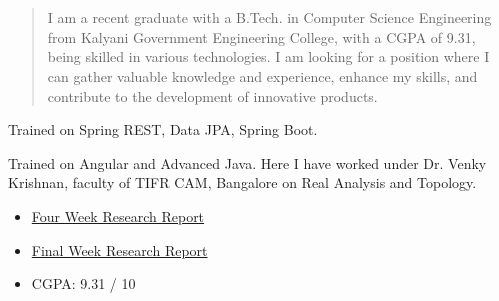 \documentclass[10pt,legalpaper,ragged2e,withhyper]{altacv}
\begin{document}
\begin{paracol}{2}


    \\
    \\

    \newpage

    \switchcolumn

    \begin{quote}
        I am a recent graduate with a B.Tech. in Computer Science Engineering from Kalyani Government Engineering College, with a CGPA of 9.31, being skilled in various technologies. I am looking for a position where I can gather valuable knowledge and experience, enhance my skills, and contribute to the development of innovative products.
    \end{quote}

    Trained on Spring REST, Data JPA, Spring Boot.
    \divider

    Trained on Angular and Advanced Java.
    \divider
    Here I have worked under Dr. Venky Krishnan, faculty of TIFR CAM, Bangalore on Real Analysis and Topology. \\
    \begin{itemize}
        \item \href{https://www.academia.edu/94639467/Four_Week_Research_Report_of_IASC_INSA_NASI_Summer_Research_Fellowship?source=swp_share}{Four Week Research Report}
        \item \href{https://www.academia.edu/94640080/Final_Week_Research_Report_of_IASC_INSA_NASI_Summer_Research_Fellowship?source=swp_share}{Final Week Research Report}
    \end{itemize}

    \begin{itemize}
        \item CGPA: 9.31 / 10
    \end{itemize}


\end{paracol}
\end{document}
